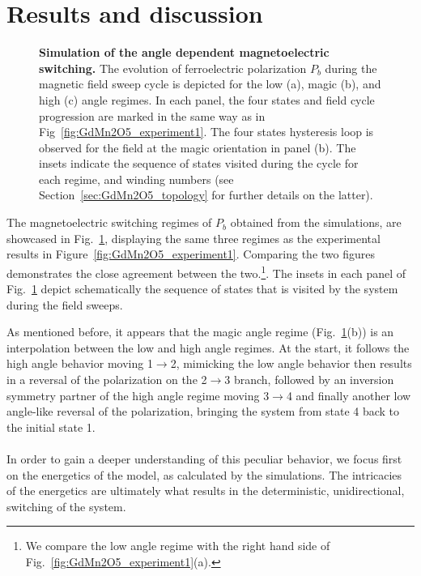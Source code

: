 \section{Results and discussion \label{sec:GdMn2O5_results_discussion}}
\begin{figure}
    \caption{\label{fig:GdMn2O5_theory}{\bf Simulation of the angle dependent magnetoelectric switching.}
    The evolution of ferroelectric polarization $P_b$ during the magnetic field sweep cycle is depicted for the low (a), magic (b), and high (c) angle regimes. 
   In each panel, the four states and field cycle progression are marked in the same way as in Fig~\ref{fig:GdMn2O5_experiment1}. The four states hysteresis loop is observed for the field at the magic orientation in panel (b). 
    The insets indicate the sequence of states visited during the cycle for each regime, and winding numbers (see Section~\ref{sec:GdMn2O5_topology} for further details on the latter).
}
\end{figure}
The magnetoelectric switching regimes of $P_b$ obtained from the simulations, are showcased in Fig.~\ref{fig:GdMn2O5_theory}, displaying the same three regimes as the experimental results in Figure~\ref{fig:GdMn2O5_experiment1}.
Comparing the two figures demonstrates the close agreement between the two.\footnote{We compare the low angle regime with the right hand side of Fig.~\ref{fig:GdMn2O5_experiment1}(a).}.
The insets in each panel of Fig.~\ref{fig:GdMn2O5_theory} depict schematically the sequence of states that is visited by the system during the field sweeps.

As mentioned before, it appears that the magic angle regime (Fig.~\ref{fig:GdMn2O5_theory}(b)) is an interpolation between the low and high angle regimes.
At the start, it follows the high angle behavior moving 1$\rightarrow$2, mimicking the low angle behavior then results in a reversal of the polarization on the 2$\rightarrow$3 branch, followed by an inversion symmetry partner of the high angle regime moving 3$\rightarrow$4 and finally another low angle-like reversal of the polarization, bringing the system from state 4 back to the initial state 1. 
\\\\
In order to gain a deeper understanding of this peculiar behavior, we focus first on the energetics of the model, as calculated by the simulations.
The intricacies of the energetics are ultimately what results in the deterministic, unidirectional, switching of the system.

